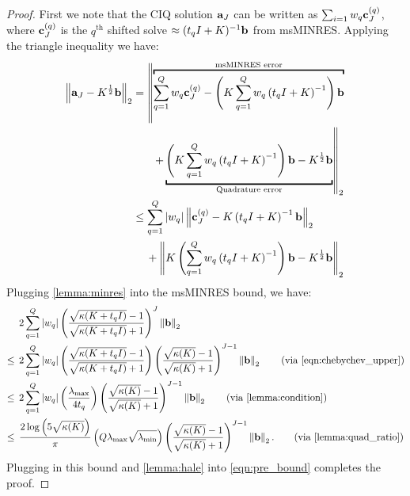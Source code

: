 \begin{proof}
  First we note that the CIQ solution $\mathbf{a}_J$ can be written as $\sum_{i=1} w_q \mathbf{c}^{(q)}_J$, where $\mathbf{c}^{(q)}_J$ is the $q^\text{th}$ shifted solve $\approx (t_q I + K)^{-1} \mathbf{b}$ from msMINRES.
  Applying the triangle inequality we have:
  \begin{align}
    \left\Vert \ba_J - \bK^{\frac 1 2} \bb \right\Vert_2
    &=
    \left\Vert \overbracket{\sum_{q=1}^Q w_q \bc^{(q)}_J - \left( \bK \sum_{q=1}^Q w_q \left( t_q \bI + \bK \right)^{-1} \right) \bb }^{\text{msMINRES error}} \right.
    \nonumber
    \\
    &\phantom{=} \quad \left. + \underbracket{\left( \bK \sum_{q=1}^Q w_q \left( t_q \bI + \bK \right)^{-1} \right) \bb - \bK^{\frac 1 2} \bb}_{\text{Quadrature error}} \right\Vert_2
    \nonumber
    \\
    &\leq \sum_{q=1}^Q \vert w_q \vert \left\Vert \bc^{(q)}_J - \bK \left( t_q \bI + \bK \right)^{-1} \bb \right\Vert_2
    \nonumber
    \\
    &\phantom{=} \:\: + \left\Vert \bK \left( \sum_{q=1}^Q w_q \left( t_q \bI + \bK \right)^{-1} \right) \bb - \bK^{\frac 1 2} \bb \right\Vert_2
    \label{eqn:pre_bound}
  \end{align}
  Plugging \cref{lemma:minres} into the msMINRES bound, we have:
  \begin{align*}
    &2 \sum_{q=1}^Q \left\vert w_q \right\vert
    \left( \frac{ \sqrt{\kappa(\bK + t_q \bI)} - 1}{ \sqrt{\kappa(\bK + t_q \bI)} + 1} \right)^J \left\Vert \bb \right\Vert_2
    \\
    \leq \:\:
    &2 \sum_{q=1}^Q \left\vert w_q \right\vert
    \left( \frac{ \sqrt{\kappa(\bK + t_q \bI)} - 1}{ \sqrt{\kappa(\bK + t_q \bI)} + 1} \right)
    \left( \frac{ \sqrt{\kappa(\bK)} - 1}{ \sqrt{\kappa(\bK)} + 1} \right)^{J-1}
    \left\Vert \bb \right\Vert_2
    \tag{via \eqref{eqn:chebychev_upper}}
    \\
    \leq \:\:
    &2 \sum_{q=1}^Q \left\vert w_q \right\vert
    \left( \frac{ \lambda_\text{max} }{ 4 t_q } \right)
    \left( \frac{ \sqrt{\kappa(\bK)} - 1}{ \sqrt{\kappa(\bK)} + 1} \right)^{J-1}
    \left\Vert \bb \right\Vert_2
    \tag{via \cref{lemma:condition}}
    \\
    \leq \:\:
    & \frac{ 2 \log \left( 5 \sqrt{\kappa(\bK)} \right) }{\pi} \left( Q \lambda_\text{max} \sqrt{\lambda_\text{min}} \right)
    \left( \frac{ \sqrt{\kappa(\bK)} - 1}{ \sqrt{\kappa(\bK)} + 1} \right)^{J-1}
    \left\Vert \bb \right\Vert_2.
    \tag{via \cref{lemma:quad_ratio}}
  \end{align*}
  Plugging in this bound and \cref{lemma:hale} into \cref{eqn:pre_bound} completes the proof.
\end{proof}

